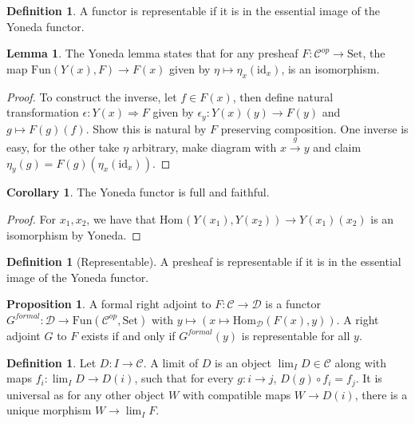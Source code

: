 \documentclass[a4paper,10pt]{article}
\theoremstyle{definition}
\newtheorem{definition}[theorem]{Definition}
\newtheorem{corollary}[theorem]{Corollary}
\newtheorem{lemma}[theorem]{Lemma}
\newtheorem{proposition}[theorem]{Proposition}
\newcommand{\Hom}[3][C]{\mathrm{Hom}_\mathcal{#1}(#2, #3)}
\newcommand{\C}{\mathcal{C}}
\newcommand{\D}{\mathcal{D}}
\newcommand{\id}{\mathrm{id}}
\newcommand{\Set}{\mathrm{Set}}
\begin{document}
\begin{definition}
    A functor is representable if it is in the essential image of the Yoneda functor. 
\end{definition}

\begin{lemma}
    The Yoneda lemma states that for any presheaf $F \colon \C^{op} \rightarrow \Set$, the map $\mathrm{Fun}(Y(x), F) \rightarrow F(x)$ given by $\eta \mapsto \eta_x(\id_x)$, is an isomorphism.
\end{lemma}

\begin{proof}
    To construct the inverse, let $f \in F(x)$, then define natural transformation $\epsilon \colon Y(x) \Rightarrow F$ given by $\epsilon_y \colon Y(x)(y) \rightarrow F(y)$ and $g \mapsto F(g)(f)$. Show this is natural by $F$ preserving composition. One inverse is easy, for the other take $\eta$ arbitrary, make diagram with $x \xrightarrow{g} y$ and claim $\eta_y(g) = F(g)(\eta_x(\id_x))$.
\end{proof}

\begin{corollary}
    The Yoneda functor is full and faithful.
\end{corollary}
\begin{proof}
    For $x_1, x_2$, we have that $\Hom[{}]{Y({x_1})}{Y(x_2)} \longrightarrow Y(x_1)(x_2)$ is an isomorphism by Yoneda. 
\end{proof}

\begin{definition}[Representable]
    A presheaf is representable if it is in the essential image of the Yoneda functor.
\end{definition}

\begin{proposition}
    A formal right adjoint to $F \colon \C \rightarrow \D$ is a functor $G^{\mathit{formal}} \colon \mathcal{D} \rightarrow \mathrm{Fun}(\C^{op}, \Set)$ with $y \mapsto (x \mapsto \Hom[D]{F(x)}{y})$. A right adjoint $G$ to $F$ exists if and only if $G^{formal}(y)$ is representable for all $y$.
\end{proposition}

\begin{definition}
    Let $D \colon I \rightarrow \C$. A limit of $D$ is an object $\lim_I D \in \C$ along with maps $f_i \colon \lim_I D \rightarrow D(i)$, such that for every $g \colon i \rightarrow j$, $D(g) \circ f_i = f_j$. It is universal as for any other object $W$ with compatible maps $W \rightarrow D(i)$, there is a unique morphism $W \rightarrow \lim_I F$.
\end{definition}
\end{document}
